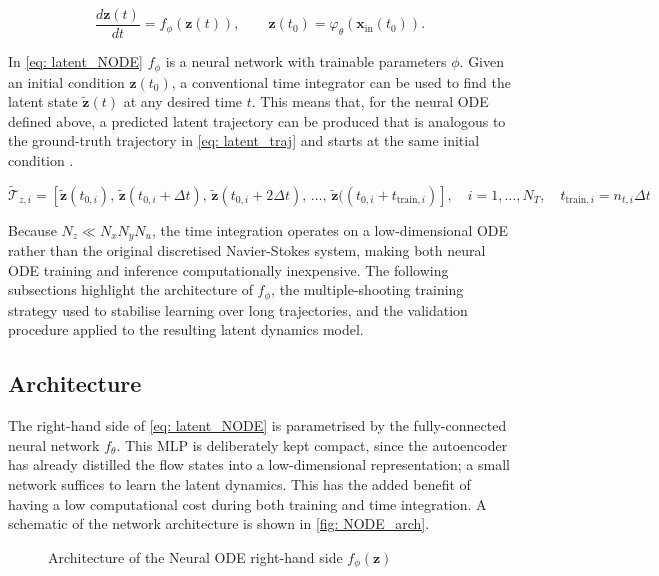 \begin{equation}\label{eq: latent_NODE}
    \frac{d\mathbf{z}(t)}{dt} = f_\phi(\mathbf{z}(t)), \qquad \mathbf{z}(t_0) = \varphi_\theta(\mathbf{x}_\text{in}(t_0)).
\end{equation}

In \autoref{eq: latent_NODE} $f_\phi$ is a neural network with trainable parameters $\phi$. Given an initial condition $\mathbf{z}(t_0)$, a conventional time integrator can be used to find the latent state $\tilde{\mathbf{z}}(t)$ at any desired time $t$. This means that, for the neural ODE defined above, a predicted latent trajectory can be produced that is analogous to the ground-truth trajectory in \autoref{eq: latent_traj} and starts at the same initial condition \cite{Nair2024}. 

\begin{equation}\label{eq: latent_traj_pred}
    \tilde{\mathcal{T}}_{z,i} = [\tilde{\mathbf{z}}(t_{0,i}),\, \tilde{\mathbf{z}}(t_{0,i} + \Delta t),\, \tilde{\mathbf{z}}(t_{0,i} + 2\Delta t),\, \ldots,\, \tilde{\mathbf{z}}((t_{0,i} + t_{\text{train}, i})], \quad i = 1, \ldots, N_T, \quad t_{\text{train}, i} = n_{t,i}\Delta t
\end{equation}

Because $N_z \ll N_x N_y N_u$, the time integration operates on a low-dimensional ODE rather than the original discretised Navier-Stokes system, making both neural ODE training and inference computationally inexpensive. The following subsections highlight the architecture of $f_\phi$, the multiple-shooting training strategy used to stabilise learning over long trajectories, and the validation procedure applied to the resulting latent dynamics model.


\subsection{Architecture}
\label{subsect: NODEarch}

The right-hand side of \autoref{eq: latent_NODE} is parametrised by the fully-connected neural network $f_\theta$. This MLP is deliberately kept compact, since the autoencoder has already distilled the flow states into a low-dimensional representation; a small network suffices to learn the latent dynamics. This has the added benefit of having a low computational cost during both training and time integration. A schematic of the network architecture is shown in \autoref{fig: NODE_arch}.

 \begin{figure}[H]
    \centering
    
    \caption{Architecture of the Neural ODE right-hand side $f_\phi(\mathbf{z})$}
    \label{fig: NODE_arch}
\end{figure}

